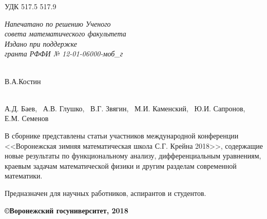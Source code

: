 \noindent УДК 517.5 517.9

\begin{flushright}
{\it Напечатано по решению Ученого \\ совета математического
факультета \\
\vspace{5mm} Издано при поддержке \\
гранта РФФИ № 12-01-06000-моб\_г }
 \end{flushright}
\vspace{15mm}{\bf Материалы работы международной конференции <<Воронежская зимняя математическая школа С.Г.
Крейна - 2018>>. Воронеж: ВГУ, 2018 -  с.}

\vspace{5mm}

 \\
В.А.Костин

\vspace{5mm}

 \\
А.Д. Баев, \  А.В. Глушко, \ В.Г. Звягин, \ М.И. Каменский, \ Ю.И. Сапронов, \\
Е.М. Семенов

\vspace{5mm}

В сборнике представлены статьи участников международной конференции <<Воронежская зимняя математическая школа С.Г. Крейна 2018>>, содержащие новые
результаты по функциональному анализу, дифференциальным уравнениям,
краевым задачам математической физики и другим разделам современной
математики.

Предназначен для научных работников, аспирантов и студентов. \\

\vspace{2mm}

\begin{flushright}
{\bf \copyright Воронежский госуниверситет, 2018}
\end{flushright}

\newpage
